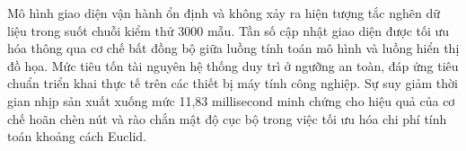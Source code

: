 Mô hình giao diện vận hành ổn định và không xảy ra hiện tượng tắc nghẽn dữ liệu trong suốt chuỗi kiểm thử 3000 mẫu. Tần số cập nhật giao diện được tối ưu hóa thông qua cơ chế bất đồng bộ giữa luồng tính toán mô hình và luồng hiển thị đồ họa. Mức tiêu tốn tài nguyên hệ thống duy trì ở ngưỡng an toàn, đáp ứng tiêu chuẩn triển khai thực tế trên các thiết bị máy tính công nghiệp. Sự suy giảm thời gian nhịp sản xuất xuống mức 11,83 millisecond minh chứng cho hiệu quả của cơ chế hoãn chèn nút và rào chắn mật độ cục bộ trong việc tối ưu hóa chi phí tính toán khoảng cách Euclid.